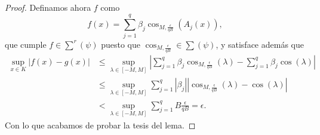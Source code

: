 \begin{proof}
    Definamos ahora $f$ como 
    \begin{equation}
        f(x) = \sum_{j=1}^q \beta_j 
        \cos_{M, \frac{\epsilon}{q B}}(A_j(x)),
    \end{equation}
    que cumple $f \in \sum^r(\psi)$  puesto que 
    $\cos_{M, \frac{\epsilon}{q B}} \in \sum(\psi)$, 
    y satisface además que
    \begin{equation}
        \begin{split}
        \sup_{x \in K} | f(x) - g(x)| 
        &\leq
        \sup_{\lambda \in [-M, M]} 
        | \sum_{j=1}^q \beta_j \cos_{M, \frac{\epsilon}{q B}}(\lambda )
         - 
         \sum_{j=1}^q \beta_j \cos(\lambda )|  \\
        &\leq
        \sup_{\lambda \in [-M, M]} 
        \sum_{j=1}^q 
            |\beta_j|
            |
                \cos_{M, \frac{\epsilon}{q B}}(\lambda)
                -
                \cos(\lambda)
            |
            \\   
            &<
            \sup_{\lambda \in [-M, M]} 
            \sum_{j=1}^q   
                B
                \frac{\epsilon}{q B}
            = \epsilon.
        \end{split}
    \end{equation}
     Con lo que acabamos de probar la tesis del lema. 
\end{proof}



